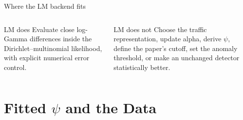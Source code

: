 \documentclass[aspectratio=169,10pt]{beamer}
\begin{document}
\begin{frame}{Where the LM backend fits}
\centering
{}

\vspace{0.60cm}
\begin{columns}[T,onlytextwidth]
\begin{exampleblock}{LM does}
Evaluate close log-Gamma differences inside the Dirichlet--multinomial
likelihood, with explicit numerical error control.
\end{exampleblock}

\begin{alertblock}{LM does not}
Choose the traffic representation, update alpha, derive \(\psi\), define the
paper's cutoff, set the anomaly threshold, or make an unchanged detector
statistically better.
\end{alertblock}
\end{columns}
\end{frame}

\section{Fitted \texorpdfstring{\(\psi\)}{psi} and the Data}
\end{document}

